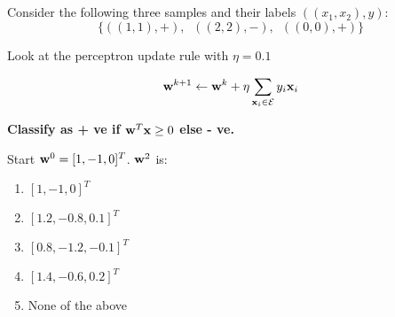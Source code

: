 \begin{frame}
\section{}
Consider the following three samples and their labels $((x_1, x_2), y)$:
\[ \{ ((1,1), +),\,\,\ ((2,2), -),\,\,\,  ((0,0),+) \}\]

Look at the perceptron update rule with $\eta = 0.1$

\[ {\bf w}^{k+1}\leftarrow {\bf w}^k + \eta \sum_{{\bf x}_i \in {\cal E}}y_i {\bf x}_i \]

{\bf Classify as + ve if ${\bf w}^T{\bf x} \geq 0$ else - ve.}

  Start ${\bf w}^0 = [1,-1, 0]^T $.  ${\bf w}^2$ is:
    \begin{enumerate}[label=(\Alph*)]
      \item $[1,-1,0]^T$    %
     \item $[1.2,-0.8,0.1]^T$
     \item $[0.8,-1.2,-0.1]^T$
     \item $[1.4,-0.6,0.2]^T$
     \item None of the above    %
    \end{enumerate}
\end{frame}
